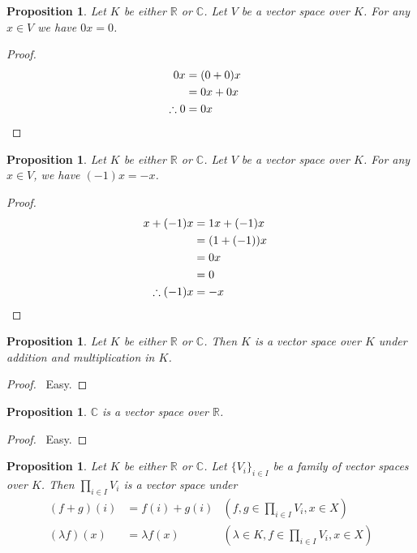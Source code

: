 \documentclass{book}
\let\qed\relax
\newtheorem{prop}[ax]{Proposition}
\theoremstyle{definition}
\begin{document}
\begin{prop}
\label{prop:zerotimes}
Let $K$ be either $\mathbb{R}$ or $\mathbb{C}$. Let $V$ be a vector space over $K$. For any $x \in V$ we have $0x = 0$.
\end{prop}

\begin{proof}
\pf
\begin{align*}
0x & = (0 + 0) x \\
& = 0x + 0x \\
\therefore 0 & = 0x & \qed
\end{align*}
\end{proof}

\begin{prop}
Let $K$ be either $\mathbb{R}$ or $\mathbb{C}$. Let $V$ be a vector space over $K$. For any $x \in V$, we have $(-1)x = -x$.
\end{prop}

\begin{proof}
\pf
\begin{align*}
x + (-1)x & = 1x + (-1) x \\
& = (1 + (-1))x \\
& = 0 x \\
& = 0 \\
\therefore (-1)x & = -x & \qed
\end{align*}
\end{proof}

\begin{prop}
Let $K$ be either $\mathbb{R}$ or $\mathbb{C}$. Then $K$ is a vector space over $K$ under addition and multiplication in $K$.
\end{prop}

\begin{proof}
\pf\ Easy. \qed
\end{proof}

\begin{prop}
$\mathbb{C}$ is a vector space over $\mathbb{R}$.
\end{prop}

\begin{proof}
\pf\ Easy. \qed
\end{proof}

\begin{prop}
Let $K$ be either $\mathbb{R}$ or $\mathbb{C}$. Let $\{ V_i \}_{i \in I}$ be a family of vector spaces over $K$. Then $\prod_{i \in I} V_i$ is a vector space under
\begin{align*}
(f + g)(i) & = f(i) + g(i) & (f,g \in \prod_{i \in I} V_i, x \in X) \\
(\lambda f)(x) & = \lambda f(x) & (\lambda \in K, f \in \prod_{i \in I} V_i, x \in X)
\end{align*}
\end{prop}
\end{document}
